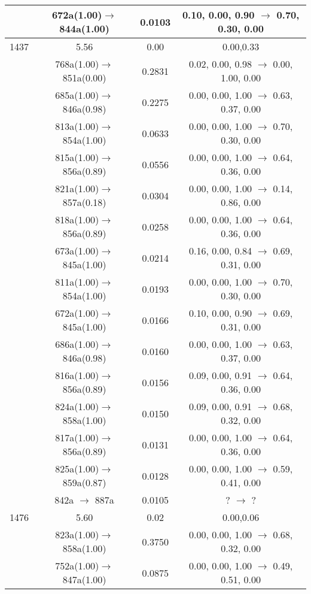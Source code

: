 \documentclass[10pt,a4paper]{article}
\begin{document}
\begin{longtable}{c|c|c|c}
 	& 672a(1.00)$\rightarrow$844a(1.00) &	 0.0103 &	 0.10, 0.00, 0.90 $\rightarrow$ 0.70, 0.30, 0.00 \\ 
 \hline1437 &	 5.56 &	 0.00 &	 0.00,0.33 \\ 
  	& 768a(1.00)$\rightarrow$851a(0.00) &	 0.2831 &	 0.02, 0.00, 0.98 $\rightarrow$ 0.00, 1.00, 0.00 \\ 
 	& 685a(1.00)$\rightarrow$846a(0.98) &	 0.2275 &	 0.00, 0.00, 1.00 $\rightarrow$ 0.63, 0.37, 0.00 \\ 
 	& 813a(1.00)$\rightarrow$854a(1.00) &	 0.0633 &	 0.00, 0.00, 1.00 $\rightarrow$ 0.70, 0.30, 0.00 \\ 
 	& 815a(1.00)$\rightarrow$856a(0.89) &	 0.0556 &	 0.00, 0.00, 1.00 $\rightarrow$ 0.64, 0.36, 0.00 \\ 
 	& 821a(1.00)$\rightarrow$857a(0.18) &	 0.0304 &	 0.00, 0.00, 1.00 $\rightarrow$ 0.14, 0.86, 0.00 \\ 
 	& 818a(1.00)$\rightarrow$856a(0.89) &	 0.0258 &	 0.00, 0.00, 1.00 $\rightarrow$ 0.64, 0.36, 0.00 \\ 
 	& 673a(1.00)$\rightarrow$845a(1.00) &	 0.0214 &	 0.16, 0.00, 0.84 $\rightarrow$ 0.69, 0.31, 0.00 \\ 
 	& 811a(1.00)$\rightarrow$854a(1.00) &	 0.0193 &	 0.00, 0.00, 1.00 $\rightarrow$ 0.70, 0.30, 0.00 \\ 
 	& 672a(1.00)$\rightarrow$845a(1.00) &	 0.0166 &	 0.10, 0.00, 0.90 $\rightarrow$ 0.69, 0.31, 0.00 \\ 
 	& 686a(1.00)$\rightarrow$846a(0.98) &	 0.0160 &	 0.00, 0.00, 1.00 $\rightarrow$ 0.63, 0.37, 0.00 \\ 
 	& 816a(1.00)$\rightarrow$856a(0.89) &	 0.0156 &	 0.09, 0.00, 0.91 $\rightarrow$ 0.64, 0.36, 0.00 \\ 
 	& 824a(1.00)$\rightarrow$858a(1.00) &	 0.0150 &	 0.09, 0.00, 0.91 $\rightarrow$ 0.68, 0.32, 0.00 \\ 
 	& 817a(1.00)$\rightarrow$856a(0.89) &	 0.0131 &	 0.00, 0.00, 1.00 $\rightarrow$ 0.64, 0.36, 0.00 \\ 
 	& 825a(1.00)$\rightarrow$859a(0.87) &	 0.0128 &	 0.00, 0.00, 1.00 $\rightarrow$ 0.59, 0.41, 0.00 \\ 
 	& 842a $\rightarrow$ 887a &	 0.0105 &	 ? $\rightarrow$ ?  \\ 
 \hline1476 &	 5.60 &	 0.02 &	 0.00,0.06 \\ 
  	& 823a(1.00)$\rightarrow$858a(1.00) &	 0.3750 &	 0.00, 0.00, 1.00 $\rightarrow$ 0.68, 0.32, 0.00 \\ 
 	& 752a(1.00)$\rightarrow$847a(1.00) &	 0.0875 &	 0.00, 0.00, 1.00 $\rightarrow$ 0.49, 0.51, 0.00 \\ 

\end{longtable}
\end{document}
